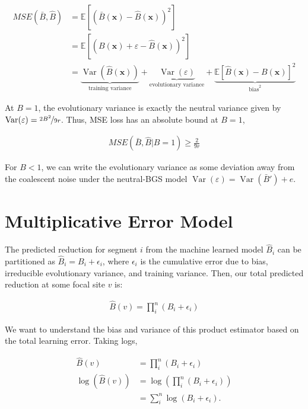 \documentclass[11pt]{article}
\newcommand{\E}{\mathbb{E}}
\DeclareMathOperator{\var}{Var}
\begin{document}
\begin{align}
  MSE(\bar{B}, \hat{B}) &= \E[(\bar{B}(\mathbf{x}) - \hat{B}(\mathbf{x}))^2] \\
                        &= \E[(B(\mathbf{x}) + \varepsilon - \hat{B}(\mathbf{x}))^2] \\
                        &= \underbrace{\var(\hat{B}(\mathbf{x}))}_\text{training variance} + 
                      \underbrace{\var(\varepsilon)}_\text{evolutionary variance} + \underbrace{\E[\hat{B}(\mathbf{x}) - B(\mathbf{x})]^2}_{\mathrm{bias}^2}
\end{align}

At $B=1$, the evolutionary variance is exactly the neutral variance given by
$\var(\varepsilon) = \nicefrac{2B^2}{9r}$. Thus, MSE loss has an absolute bound at
$B=1$,

\begin{align}
  MSE(\bar{B}, \hat{B} | B = 1) \ge \frac{2}{9r}
\end{align}

For $B < 1$, we can write the evolutionary variance as some deviation
away from the coalescent noise under the neutral-BGS model $\var(\varepsilon) =
\var(\bar{B}') + e$.




\section*{Multiplicative Error Model}

The predicted reduction for segment $i$ from the machine learned model
$\hat{B}_i$ can be partitioned as $\hat{B}_i = B_i + \epsilon_i$, where
$\epsilon_i$ is the cumulative error due to bias, irreducible evolutionary
variance, and training variance. Then, our total predicted reduction at some
focal site $v$ is:

\begin{align}
  \hat{B}(v) = \prod_i^n (B_i + \epsilon_i)
\end{align}

We want to understand the bias and variance of this product estimator based on
the total learning error. Taking logs, 

\begin{align}
  \hat{B}(v) &= \prod_i^n (B_i + \epsilon_i) \\
  \log(\hat{B}(v)) &= \log\left(\prod_i^n (B_i + \epsilon_i) \right) \\
                   &= \sum_i^n \log(B_i + \epsilon_i). \\
\end{align}
\end{document}
